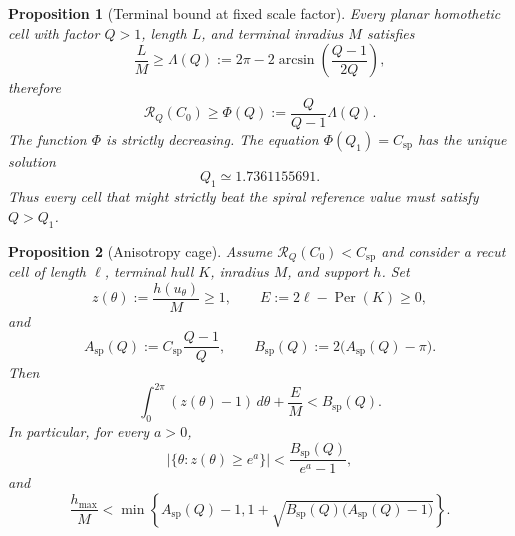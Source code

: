 \documentclass[10pt,a4paper]{article}
\newtheorem{proposition}[proposition]{Proposition}
\theoremstyle{definition}
\theoremstyle{remark}
\DeclareMathOperator{\Per}{Per}
\newcommand{\abs}[1]{\lvert #1\rvert}
\newcommand{\cellratio}{\mathcal{R}}
\newcommand{\spc}{C_{\mathrm{sp}}}
\begin{document}
\begin{proposition}[Terminal bound at fixed scale factor]
\label{prop:terminal-bound}
Every planar homothetic cell with factor $Q>1$, length $L$, and terminal inradius $M$ satisfies
\begin{equation}
\frac{L}{M}\ge
\Lambda(Q):=2\pi-2\arcsin\left(\frac{Q-1}{2Q}\right),
\label{eq:Lambda}
\end{equation}
therefore
\begin{equation}
\cellratio_Q(C_0)\ge
\Phi(Q):=\frac{Q}{Q-1}\Lambda(Q).
\label{eq:Phi}
\end{equation}
The function $\Phi$ is strictly decreasing. The equation $\Phi(Q_1)=\spc$ has the unique solution
\begin{equation}
Q_1\simeq1.7361155691.
\label{eq:Q1}
\end{equation}
Thus every cell that might strictly beat the spiral reference value must satisfy $Q>Q_1$.
\end{proposition}

\begin{proposition}[Anisotropy cage]
\label{prop:anisotropy-cage}
Assume $\cellratio_Q(C_0)<\spc$ and consider a recut cell of length $\ell$, terminal hull $K$, inradius $M$, and support $h$. Set
\[
z(\theta):=\frac{h(u_\theta)}{M}\ge1,
\qquad
E:=2\ell-\Per(K)\ge0,
\]
and
\begin{equation}
A_{\mathrm{sp}}(Q):=\spc\frac{Q-1}{Q},
\qquad
B_{\mathrm{sp}}(Q):=2\bigl(A_{\mathrm{sp}}(Q)-\pi\bigr).
\label{eq:Asp-Bsp}
\end{equation}
Then
\begin{equation}
\int_0^{2\pi}(z(\theta)-1)\,d\theta+\frac{E}{M}
<B_{\mathrm{sp}}(Q).
\label{eq:anisotropy-budget}
\end{equation}
In particular, for every $a>0$,
\begin{equation}
\abs{\{\theta:z(\theta)\ge e^a\}}
<\frac{B_{\mathrm{sp}}(Q)}{e^a-1},
\label{eq:anisotropy-width}
\end{equation}
and
\begin{equation}
\frac{h_{\max}}{M}
<\min\left\{
A_{\mathrm{sp}}(Q)-1,
1+\sqrt{B_{\mathrm{sp}}(Q)\bigl(A_{\mathrm{sp}}(Q)-1\bigr)}
\right\}.
\label{eq:anisotropy-cap}
\end{equation}
\end{proposition}
\end{document}
